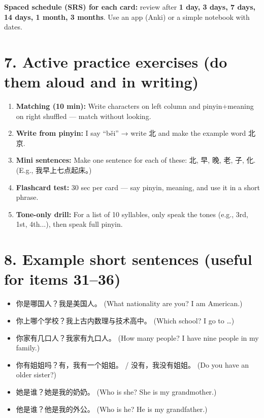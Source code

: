 \documentclass[12pt]{article}
\begin{document}
\begin{CJK}{UTF8}{gbsn}
\textbf{Spaced schedule (SRS) for each card:} review after \textbf{1 day, 3 days, 7 days, 14 days, 1 month, 3 months}.  
Use an app (Anki) or a simple notebook with dates.

\section*{7. Active practice exercises (do them aloud and in writing)}
\begin{enumerate}
  \item \textbf{Matching (10 min):} Write characters on left column and pinyin+meaning on right shuffled — match without looking.
  \item \textbf{Write from pinyin:} I say ``běi'' → write 北 and make the example word 北京.
  \item \textbf{Mini sentences:} Make one sentence for each of these: 北, 早, 晚, 老, 子, 化. (E.g., 我早上七点起床。)
  \item \textbf{Flashcard test:} 30 sec per card — say pinyin, meaning, and use it in a short phrase.
  \item \textbf{Tone-only drill:} For a list of 10 syllables, only speak the tones (e.g., 3rd, 1st, 4th...), then speak full pinyin.
\end{enumerate}

\section*{8. Example short sentences (useful for items 31--36)}
\begin{itemize}
  \item 你是哪国人？\quad 我是美国人。 (What nationality are you? I am American.)
  \item 你上哪个学校？\quad 我上古内数理与技术高中。 (Which school? I go to \dots)
  \item 你家有几口人？\quad 我家有九口人。 (How many people? I have nine people in my family.)
  \item 你有姐姐吗？\quad 有，我有一个姐姐。 / 没有，我没有姐姐。 (Do you have an older sister?)
  \item 她是谁？\quad 她是我的奶奶。 (Who is she? She is my grandmother.)
  \item 他是谁？\quad 他是我的外公。 (Who is he? He is my grandfather.)
\end{itemize}


\end{CJK}
\end{document}
